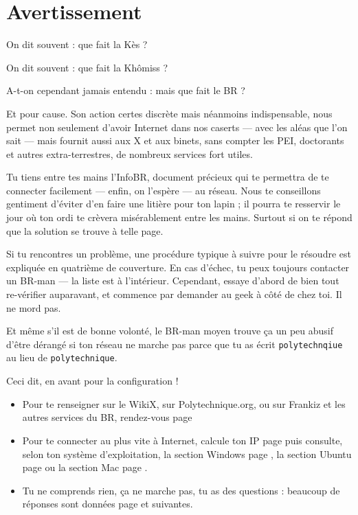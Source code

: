 \thispagestyle{empty}

\section*{Avertissement}

On dit souvent : \og que fait la Kès ? \fg

On dit souvent : \og que fait la Khômiss ? \fg

A-t-on cependant jamais entendu : \og mais que fait le BR ? \fg

Et pour cause. Son action certes discrète mais néanmoins indispensable, nous permet non seulement d'avoir Internet dans nos caserts --- avec les aléas que l'on sait --- mais fournit aussi aux X et aux binets,
sans compter les PEI, doctorants et autres extra-terrestres, de nombreux services fort utiles.

Tu tiens entre tes mains l'InfoBR, document pr\'ecieux qui te permettra de te connecter facilement
--- enfin, on l'esp\`ere --- au r\'eseau.
Nous te conseillons gentiment d'\'eviter d'en faire une liti\`ere pour ton lapin ; il pourra te resservir le jour o\`u ton ordi te cr\`evera mis\'erablement entre les
mains. Surtout si on te r\'epond que la solution se trouve \`a telle page.

Si tu rencontres un probl\`eme, une proc\'edure typique \`a suivre pour le r\'esoudre est expliqu\'ee en quatri\`eme de couverture.
En cas d'échec, tu peux toujours contacter un BR-man --- la liste est \`a l'int\'erieur.
Cependant, essaye d'abord de bien tout re-v\'erifier auparavant, et commence par demander au geek à côté de chez toi. Il ne mord pas.

Et m\^eme s'il est de bonne volont\'e, le BR-man moyen trouve ça un peu abusif d'\^etre d\'erang\'e si ton r\'eseau ne
marche pas parce que tu as \'ecrit \texttt{polytechnqiue} au lieu de \texttt{polytechnique}.

Ceci dit, en avant pour la configuration !

\vfill

\begin{itemize}
\item Pour te renseigner sur le WikiX, sur Polytechnique.org, ou sur Frankiz et les autres services du BR, rendez-vous page \pageref{services}
\item Pour te connecter au plus vite à Internet, calcule ton IP page \pageref{ip} puis consulte, selon ton système d'exploitation, la section Windows page \pageref{windows},
la section Ubuntu page \pageref{ubuntu} ou la section Mac page \pageref{mac}.
\item Tu ne comprends rien, ça ne marche pas, tu as des questions : beaucoup de réponses sont données page \pageref{faq} et suivantes.

\end{itemize}

